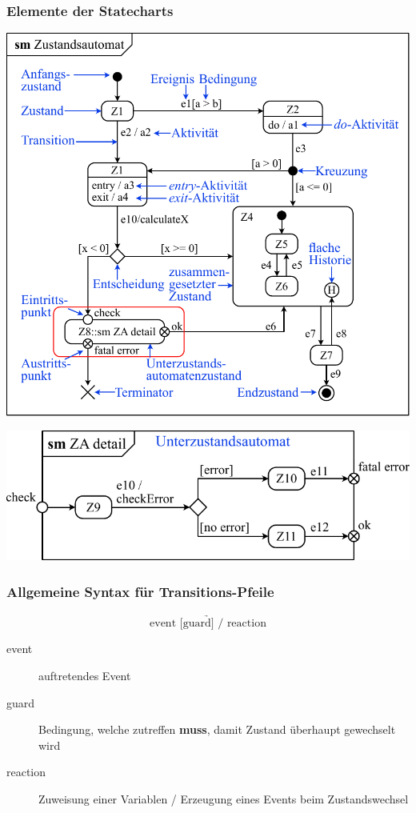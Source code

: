 \subsubsection{Elemente der Statecharts}

\begin{center}
    \includegraphics[width=0.8\columnwidth]{images/statechart_overview.pdf}

    \vspace{0.2cm}

    \includegraphics[width=0.6\columnwidth]{images/statechart_overview_submachine.pdf}
\end{center}


\subsubsection{Allgemeine Syntax für Transitions-Pfeile}

\vspace{-0.2cm}

$$ \underrightarrow{\text{event [guard] / reaction}} $$

\begin{description}
    \item[event] auftretendes Event
    \item[guard] Bedingung, welche zutreffen \textbf{muss}, damit Zustand überhaupt gewechselt wird 
    \item[reaction] Zuweisung einer Variablen / Erzeugung eines Events beim Zustandswechsel 
\end{description}


